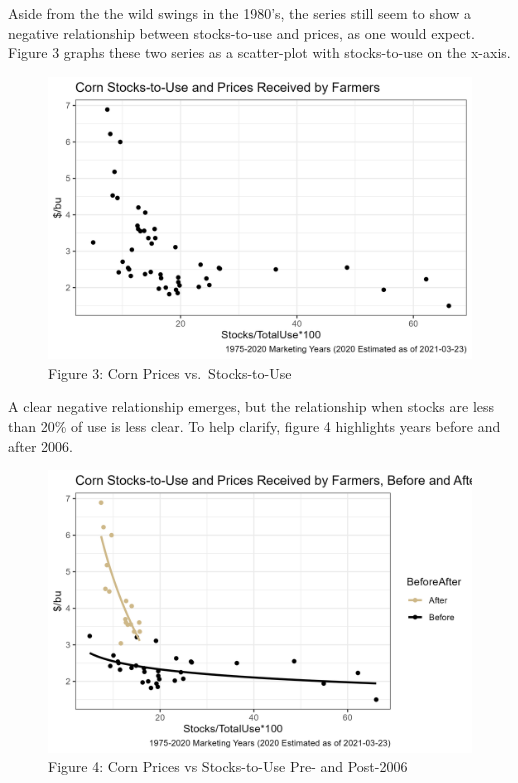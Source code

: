 \documentclass[
  letterpaper,
  DIV=11,
  numbers=noendperiod]{scrreprt}
\begin{document}
Aside from the the wild swings in the 1980's, the series still seem to
show a negative relationship between stocks-to-use and prices, as one
would expect. Figure 3 graphs these two series as a scatter-plot with
stocks-to-use on the x-axis.

\begin{figure}[H]

{\centering \includegraphics{assets/EndingStocksand-StocksUsePrices2.png}

}

\caption{Figure 3: Corn Prices vs.~Stocks-to-Use}

\end{figure}%

A clear negative relationship emerges, but the relationship when stocks
are less than 20\% of use is less clear. To help clarify, figure 4
highlights years before and after 2006.

\begin{figure}[H]

{\centering \includegraphics{assets/EndingStocksand-StocksUsePrices3.png}

}

\caption{Figure 4: Corn Prices vs Stocks-to-Use Pre- and Post-2006}

\end{figure}%
\end{document}
